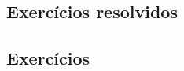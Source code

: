 \emconstrucao

\subsection*{Exercícios resolvidos}

\emconstrucao

\subsection*{Exercícios}

\emconstrucao
